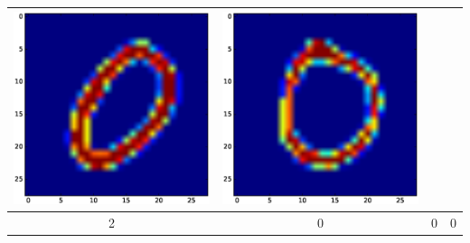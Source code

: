 \documentclass{article}
\begin{document}
\begin{tabular}{cccc}
\includegraphics[scale=.1]{fig/MNIST_653_2_2_252_0.eps}&
\includegraphics[scale=.1]{fig/MNIST_653_2_3_938_0.eps} 
 


\\
\hline 
2 & 0 & 0 & 0 \\


\end{tabular}
\end{document}
